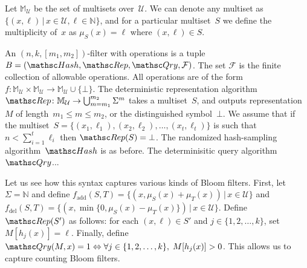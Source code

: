 Let $\mathbb{M}_\mathcal{U}$ be the set of multisets over~$\mathcal{U}$.  We can denote any multiset as $\{(x,\ell) \,|\, x \in \mathcal{U}, \ell \in \mathbb{N}\}$, and for a particular multiset~$S$ we define the multiplicity of~$x$ as $\mu_S(x) = \ell$ where $(x,\ell)\in S$.

An $(n,k,[m_1,m_2])$-filter with operations is a tuple  $B=(\Hash,\Rep,\Qry, \mathcal{F})$.  
The set $\mathcal{F}$ is the finite collection of allowable operations.  All operations are of the form 
$f: \mathbb{M}_{\mathcal{U}} \times \mathbb{M}_{\mathcal{U}} \rightarrow \mathbb{M}_{\mathcal{U}} \cup \{\bot\}$.  
%
The deterministic representation algorithm $\Rep\colon \mathbb{M}_\mathcal{U} \rightarrow \bigcup_{m=m_1}^{m_2}\Sigma^m$ takes a multiset~$S$, and outputs representation~$M$ of length~$m_1 \leq m \leq m_2$, or the distinguished symbol~$\bot$.  We assume that if the multiset~$S=\{(x_1,\ell_1),(x_2,\ell_2),\ldots,(x_t,\ell_t)\}$ is such that $n < \sum_{i=1}^t \ell_i$ then $\Rep(S)=\bot$.
%
The randomized hash-sampling algorithm~$\Hash$ is as before.
%
The determinisitic query algorithm $\Qry$... 


Let us see how this syntax captures various kinds of Bloom filters.  First, let $\Sigma = \mathbb{N}$ and define $f_{\mathrm{add}}(S,T)=\{(x,\mu_S(x)+\mu_T(x)) \,|\, x \in \mathcal{U}\}$ and $f_\mathrm{del}(S,T) = \{(x,\min\{0,\mu_S(x)-\mu_T(x)\}) \,|\, x \in \mathcal{U} \}$.  Define $\Rep(S')$ as follows: for each $(x,\ell)\in S'$ and $j\in\{1,2,\ldots,k\}$, set $M[h_j(x)]=\ell$.   Finally, define $\Qry(M,x) = 1 \Leftrightarrow \forall j \in \{1,2,\ldots,k\},\; M[h_j(x)] > 0$.  This allows us to capture counting Bloom filters. 

\fi